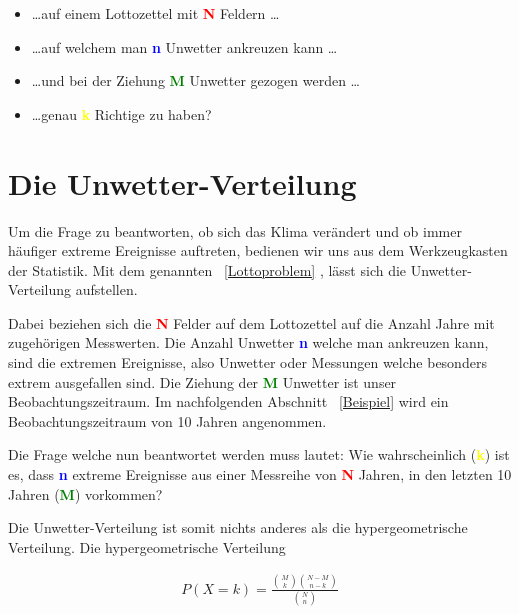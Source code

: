 \begin{refsection}
\begin{itemize}
\item \dots auf einem Lottozettel mit \textcolor{red}{\textbf{N}} Feldern \dots
\item \dots auf welchem man \textcolor{blue}{\textbf{n}} Unwetter ankreuzen kann \dots
\item \dots und bei der Ziehung \textcolor{green}{\textbf{M}} Unwetter gezogen werden \dots
\item \dots genau \textcolor{yellow}{\textbf{k}} Richtige zu haben?
\end{itemize}


\section{Die Unwetter-Verteilung}
Um die Frage zu beantworten, ob sich das Klima verändert und ob immer häufiger extreme Ereignisse auftreten, bedienen wir uns aus dem Werkzeugkasten der Statistik. Mit dem genannten ~\ref{Lottoproblem} , lässt sich die Unwetter-Verteilung aufstellen.

Dabei beziehen sich die \textcolor{red}{\textbf{N}} Felder auf dem Lottozettel auf die Anzahl Jahre mit zugehörigen Messwerten. Die Anzahl Unwetter \textcolor{blue}{\textbf{n}} welche man ankreuzen kann, sind die extremen Ereignisse, also Unwetter oder Messungen welche besonders extrem ausgefallen sind. Die Ziehung der \textcolor{green}{\textbf{M}} Unwetter ist unser Beobachtungszeitraum. Im nachfolgenden Abschnitt ~\ref{Beispiel}  wird ein Beobachtungszeitraum von 10 Jahren angenommen.

Die Frage welche nun beantwortet werden muss lautet:
Wie wahrscheinlich (\textcolor{yellow}{\textbf{k}}) ist es, dass \textcolor{blue}{\textbf{n}} extreme Ereignisse aus einer Messreihe von \textcolor{red}{\textbf{N}} Jahren, in den letzten 10 Jahren (\textcolor{green}{\textbf{M}}) vorkommen?


Die Unwetter-Verteilung ist somit nichts anderes als die hypergeometrische Verteilung. Die hypergeometrische Verteilung

\begin{align*}
P(X = k) = 
\frac{\displaystyle \binom{M}{k} \binom{N-M}{n-k}}{\displaystyle \binom{N}{n} }
\end{align*}


\end{refsection}
